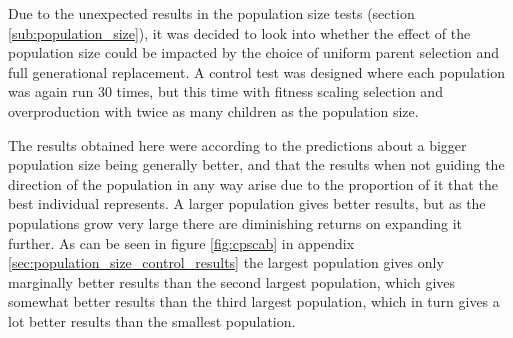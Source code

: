 Due to the unexpected results in the population size tests (section \ref{sub:population_size}), it was decided to look into whether the effect of the population size could be impacted by the choice of uniform parent selection and full generational replacement. A control test was designed where each population was again run 30 times, but this time with fitness scaling selection and overproduction with twice as many children as the population size.

The results obtained here were according to the predictions about a bigger population size being generally better, and that the results when not guiding the direction of the population in any way arise due to the proportion of it that the best individual represents. A larger population gives better results, but as the populations grow very large there are diminishing returns on expanding it further. As can be seen in figure \ref{fig:cpscab} in appendix \ref{sec:population_size_control_results} the largest population gives only marginally better results than the second largest population, which gives somewhat better results than the third largest population, which in turn gives a lot better results than the smallest population.




